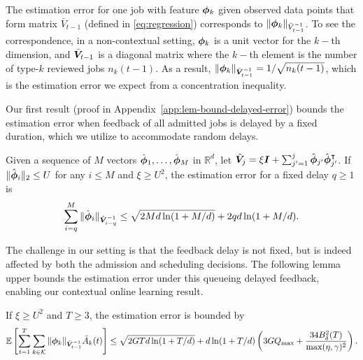 The estimation error for one job with feature $\boldsymbol{\phi}_k$ given observed data points that form matrix $\bar{V}_{t-1}$ (defined in \eqref{eq:regression}) corresponds to $\|\boldsymbol{\phi}_k\|_{\bar{V}_{t-1}^{-1}}$. To see the correspondence, in a non-contextual setting, $\boldsymbol{\phi}_k$ is a unit vector for the $k-$th dimension, and $\bar{\boldsymbol{V}}_{t-1}$ is a diagonal matrix where the $k-$th element is the number of type-$k$ reviewed jobs $n_k(t-1)$. As a result, $\|\boldsymbol{\phi}_k\|_{\bar{\boldsymbol{V}}_{t-1}^{-1}} = 1 /\sqrt{n_k(t-1)}$, which is the estimation error we expect from a concentration inequality. 

Our first result (proof in Appendix~\ref{app:lem-bound-delayed-error}) bounds the estimation error when feedback of all admitted jobs is delayed by a fixed duration, which we utilize to accommodate random delays.
\begin{lemma}\label{lem:bound-delayed-error}
Given a sequence of $M$ vectors $\hat{\boldsymbol{\phi}}_1,\ldots,\hat{\boldsymbol{\phi}}_M$ in $\mathbb{R}^d$, let $\hat{\boldsymbol{V}}_j = \xi \boldsymbol{I} + \sum_{j'=1}^j \hat{\boldsymbol{\phi}}_{j'}\hat{\boldsymbol{\phi}}_{j'}^{\intercal}$. If $\|\hat{\boldsymbol{\phi}}_i\|_2 \leq U$ for any $i \leq M$ and $\xi \geq U^2$, the estimation error for a fixed delay $q \geq 1$ is \[\sum_{i=q}^M \|\hat{\boldsymbol{\phi}}_i\|_{\hat{\boldsymbol{V}}_{i-q}^{-1}} \leq \sqrt{2Md\ln(1+M/d)}+2qd\ln(1+M/d).\]
\end{lemma}
The challenge in our setting is that the feedback delay is not fixed, but is indeed affected by both the admission and scheduling decisions. The following lemma upper bounds the estimation error under this queueing delayed feedback, enabling our contextual online learning result.

\begin{lemma}\label{lem:conbacid-error}
If $\xi \geq U^2$ and $T \geq 3$, the estimation error is bounded by 
\[
\mathbb E\left[\sum_{t=1}^T \sum_{k \in \mathcal{K}} \|\boldsymbol{\phi}_k\|_{\bar{\boldsymbol{V}}_{t-1}^{-1}}\bar{A}_k(t)\right] \leq \sqrt{2GTd\ln(1+T/d)} + d\ln(1+T/d)\left(3GQ_{\max}+\frac{34B_{\delta}^2(T)}{\max(\eta,\gamma)^2}\right).
\]
\end{lemma}

